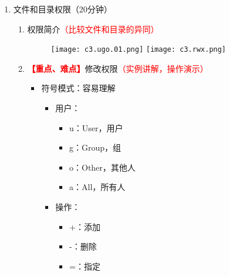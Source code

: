 \documentclass{TIJMUjiaoanLL}
\begin{document}
\begin{enumerate}
\begin{enumerate}
\begin{multicols}{2}
\begin{itemize}
	      \begin{itemize}
                \item 语法：ln -s source softlink
		\item 本质：保存原文件的路径
		\item inode：与原文件不同，是唯一的
		\item 类比：快捷方式
		\item 文件系统：能跨越
		\item 修改链接：原文件随之变化
		\item 删除链接：原文件不受影响
		\item 删除原文件：链接失效
		\item 使用对象：文件和目录
	      \end{itemize}
	  \end{itemize}
        \end{multicols}
        \vspace*{-10pt}
    \end{enumerate}

  \item 文件和目录权限（20分钟）
    \begin{enumerate}
      \item 权限简介\textcolor{red}{（比较文件和目录的异同）}
	\vspace*{-10pt}
	\begin{figure}[h]
	  \centering
          \texttt{[image: c3.ugo.01.png]}
	  \quad
          \texttt{[image: c3.rwx.png]}
	\end{figure}
	\vspace*{-10pt}
      \item \textcolor{red}{\textbf{【重点、难点】}}修改权限\textcolor{red}{（实例讲解，操作演示）}
	\begin{itemize}
	  \item 符号模式：容易理解
            \vspace*{-10pt}
            \begin{multicols}{3}
	      \begin{itemize}
		\item 用户：
		  \begin{itemize}
		    \item u：User，用户
		    \item g：Group，组
		    \item o：Other，其他人
		    \item a：All，所有人
		  \end{itemize}
		\item 操作：
		  \begin{itemize}
		    \item +：添加
		    \item -：删除
		    \item =：指定


\end{itemize}
\end{itemize}
\end{multicols}
\end{itemize}
\end{enumerate}
\end{enumerate}
\end{document}
